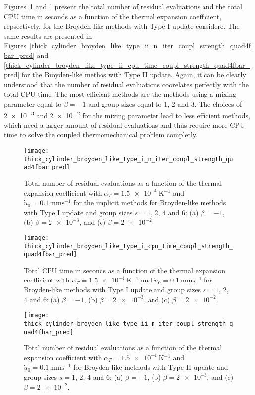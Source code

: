Figures~\ref{fig:thick_cylinder_broyden_like_type_i_n_iter_coupl_strength_quad4fbar_pred} and \ref{fig:thick_cylinder_broyden_like_type_i_n_iter_coupl_strength_quad4fbar_pred} present the total number of residual evaluations and the total CPU time in seconds as a function of the thermal expansion coefficient, repsectively, for the Broyden-like methods with Type I update considere.
The same results are presented in Figures~\ref{thick_cylinder_broyden_like_type_ii_n_iter_coupl_strength_quad4fbar_pred} and \ref{thick_cylinder_broyden_like_type_ii_cpu_time_coupl_strength_quad4fbar_pred} for the Broyden-like methos with Type II update.
Again, it can be clearly understood that the number of residual evaluations coorelates perfectly with the total CPU time.
The most efficient methods are the methods using a mixing parameter equal to \(\beta=-1\) and group sizes equal to 1, 2 and 3.
The choices of \num{2e-3} and \num{2e-2} for the mixing parameter lead to less efficient methods, which need a larger amount of residual evaluations and thus require more CPU time to solve the coupled thermomechanical problem completly.


\begin{figure}[htbp]
  \texttt{[image: thick\_cylinder\_broyden\_like\_type\_i\_n\_iter\_coupl\_strength\_quad4fbar\_pred]}
  \caption{Total number of residual evaluations as a function of the thermal expansion coefficient with \(\alpha_T=\SI{1.5e-4}{\kelvin^{-1}}\) and \(\dot u_0 =\SI{0.1}{\milli\meter\second^{-1}}\) for the implicit methods for Broyden-like methods with Type I update and group sizes \(s=1\), 2, 4 and 6: (a) \(\beta=-1\), (b) \(\beta=\num{2e-3}\), and (c) \(\beta=\num{2e-2}\).}
\label{fig:thick_cylinder_broyden_like_type_i_n_iter_coupl_strength_quad4fbar_pred}
\end{figure}

\begin{figure}[htbp]
  \texttt{[image: thick\_cylinder\_broyden\_like\_type\_i\_cpu\_time\_coupl\_strength\_quad4fbar\_pred]}
  \caption{Total CPU time in seconds as a function of the thermal expansion coefficient with \(\alpha_T=\SI{1.5e-4}{\kelvin^{-1}}\) and \(\dot u_0 =\SI{0.1}{\milli\meter\second^{-1}}\) for Broyden-like methods with Type I update and group sizes \(s=1\), 2, 4 and 6: (a) \(\beta=-1\), (b) \(\beta=\num{2e-3}\), and (c) \(\beta=\num{2e-2}\).}
\label{fig:thick_cylinder_broyden_like_type_i_cpu_time_coupl_strength_quad4fbar_pred}
\end{figure}

\begin{figure}[htbp]
  \texttt{[image: thick\_cylinder\_broyden\_like\_type\_ii\_n\_iter\_coupl\_strength\_quad4fbar\_pred]}
  \caption{Total number of residual evaluations as a function of the thermal expansion coefficient with \(\alpha_T=\SI{1.5e-4}{\kelvin^{-1}}\) and \(\dot u_0 =\SI{0.1}{\milli\meter\second^{-1}}\) for Broyden-like methods with Type II update and group sizes \(s=1\), 2, 4 and 6: (a) \(\beta=-1\), (b) \(\beta=\num{2e-3}\), and (c) \(\beta=\num{2e-2}\).}
\label{fig:thick_cylinder_broyden_like_type_ii_n_iter_coupl_strength_quad4fbar_pred}
\end{figure}

